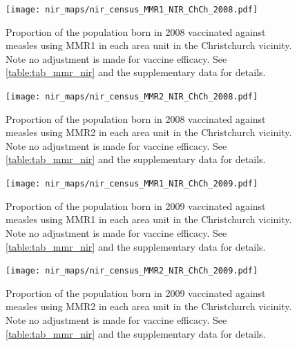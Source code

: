\documentclass{article}
\begin{document}
\begin{figure}
\begin{center}
    \texttt{[image: nir\_maps/nir\_census\_MMR1\_NIR\_ChCh\_2008.pdf]}
\end{center}
    \caption{Proportion of the population born in 2008 vaccinated against measles using MMR1 in each area unit in the Christchurch vicinity. Note no adjustment is made for vaccine efficacy. See \autoref{table:tab_mmr_nir} and the supplementary data for details.}
\label{fig:fig12008_c}
\end{figure}


\begin{figure}
\begin{center}
    \texttt{[image: nir\_maps/nir\_census\_MMR2\_NIR\_ChCh\_2008.pdf]}
 \end{center}
    \caption{Proportion of the population born in 2008 vaccinated against measles using MMR2 in each area unit in the Christchurch vicinity. Note no adjustment is made for vaccine efficacy. See \autoref{table:tab_mmr_nir} and the supplementary data for details.}
\label{fig:fig22008_c}
\end{figure}


\begin{figure}
\begin{center}
    \texttt{[image: nir\_maps/nir\_census\_MMR1\_NIR\_ChCh\_2009.pdf]}
 \end{center}
    \caption{Proportion of the population born in 2009 vaccinated against measles using MMR1 in each area unit in the Christchurch vicinity. Note no adjustment is made for vaccine efficacy. See \autoref{table:tab_mmr_nir} and the supplementary data for details.}
\label{fig:fig12009_c}
\end{figure}


\begin{figure}
\begin{center}
    \texttt{[image: nir\_maps/nir\_census\_MMR2\_NIR\_ChCh\_2009.pdf]}
 \end{center}
    \caption{Proportion of the population born in 2009 vaccinated against measles using MMR2 in each area unit in the Christchurch vicinity. Note no adjustment is made for vaccine efficacy. See \autoref{table:tab_mmr_nir} and the supplementary data for details.}
\label{fig:fig22009_c}
\end{figure}
\end{document}
